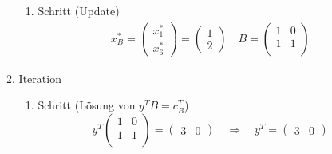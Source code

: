 \documentclass[a4paper]{scrartcl}
\begin{document}
\begin{enumerate}[label=\bfseries\arabic*.]
\begin{enumerate}[1.]
\begin{enumerate}[1.]
                    \item Schritt (Update)
                        \begin{gather}
                            x_B^* =
                            \begin{pmatrix}
                                x_1^* \\ x_6^*
                            \end{pmatrix}
                            =
                            \begin{pmatrix}
                                1 \\ 2
                            \end{pmatrix}
                            \quad
                            B =
                            \begin{pmatrix}
                                1 & 0 \\
                                1 & 1 \\
                            \end{pmatrix}
                        \end{gather}

                \end{enumerate}

            \item Iteration
                \begin{enumerate}[1.]
                    \item Schritt (Lösung von $y^TB = c_B^T$)
                        \begin{equation}
                            y^T
                            \begin{pmatrix}
                                1 & 0 \\
                                1 & 1 \\
                            \end{pmatrix}
                            =
                            \begin{pmatrix}
                                3 & 0
                            \end{pmatrix}
                            \quad\Rightarrow\quad
                            y^T =
                            \begin{pmatrix}
                                3 & 0
                            \end{pmatrix}
                        \end{equation}
                        

\end{enumerate}
\end{enumerate}
\end{enumerate}
\end{document}
